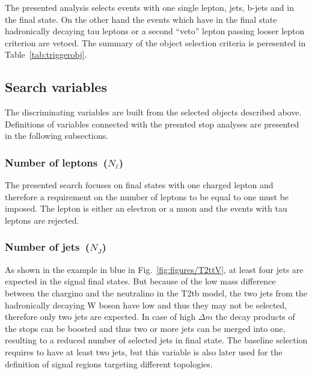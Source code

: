 The presented analysis selects events with one single lepton, jets, b-jets and \MET in the final state. On the other hand the events which have in the final state hadronically decaying tau leptons or a second ``veto'' lepton passing looser lepton criterion are vetoed. The summary of the object selection criteria is peresented in Table~\ref{tab:triggerobj}.

\subsection{Search variables~\label{sec:variables}}

The discriminating variables are built from the selected objects described above. Definitions of variables connected with the presnted stop analyses are presented in the following subsections.

\subsubsection{Number of leptons~($N_{\ell}$)}

The presented search focuses on final states with one charged lepton and therefore a requirement on the number of leptons to be equal to one must be imposed. The lepton is either an electron or a muon and the events with tau leptons are rejected.

\subsubsection{Number of jets~($N_{J}$)}

As shown in the example in blue in Fig.~\ref{fig:figures/T2ttV}, at least four jets are expected in the signal final states. But because of the low mass difference between the chargino and the neutralino in the T2tb model, the two jets from the hadronically decaying W boson have low \pt and thus they may not be selected, therefore only two jets are expected. In case of high $\Delta m$ the decay products of the stops can be boosted and thus two or more jets can be merged into one, resulting to a  reduced number of selected jets in final state. The baseline selection requires to have at least two jets, but this variable is also later used for the definition of signal regions targeting different topologies.


